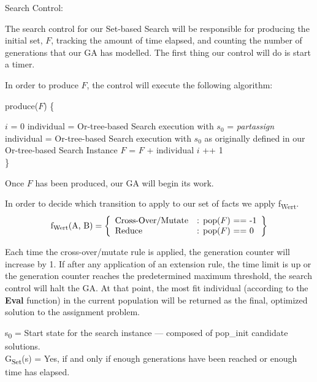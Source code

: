 \documentclass[11pt, oneside]{article}   	%
\begin{document}
\noindent Search Control:

\noindent The search control for our Set-based Search will be responsible for producing the initial set, $F$, tracking the amount of time elapsed, and counting the number of generations that our GA has modelled. The first thing our control will do is start a timer.

\noindent In order to produce $F$, the control will execute the following algorithm:

\noindent produce($F$) \{
\begin{algorithmic}[\textfloatsep = 0pt]
    \STATE $i$ = 0
		\STATE individual = Or-tree-based Search execution with $s_0$ = \textit{partassign}
	\ELSE
		\STATE individual = Or-tree-based Search execution with $s_0$ as originally defined in our Or-tree-based Search Instance
	\ENDIF
	\STATE $F$ = $F$ + individual
	\STATE $i$ ++ 1
    \ENDWHILE \\ \}
\end{algorithmic}

\noindent Once $F$ has been produced, our GA will begin its work.

\noindent In order to decide which transition to apply to our set of facts we apply f\textsubscript{Wert}.
    \[
        \text{f\textsubscript{Wert}(A, B)} = \left\{\begin{array}{ll}
            \text{Cross-Over/Mutate} & \text{: pop($F$) == -1}\\
            \text{Reduce} & \text{: pop($F$) == 0}
            \end{array}\right\}
      \]

\noindent Each time the cross-over/mutate rule is applied, the generation counter will increase by 1. If after any application of an extension rule, the time limit is up or the generation counter reaches the predetermined maximum threshold, the search control will halt the GA. At that point, the most fit individual (according to the \textbf{Eval} function) in the current population will be returned as the final, optimized solution to the assignment problem.


\noindent s\textsubscript{0} = Start state for the search instance --- composed of pop_init candidate solutions.\\
G\textsubscript{Set}(s) = Yes, if and only if enough generations have been reached or enough time has elapsed.\\\\
\end{document}
